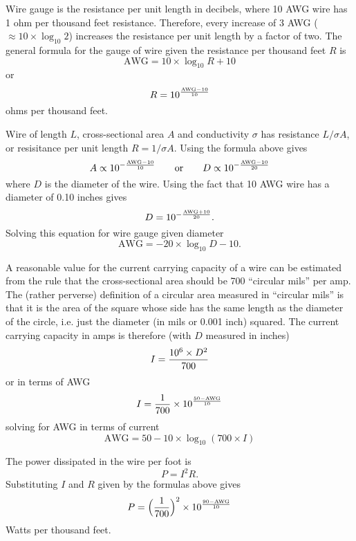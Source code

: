 \documentclass{minimal}
\begin{document}
Wire gauge is the resistance per unit length in decibels, where 10 AWG
wire has 1 ohm per thousand feet resistance.  Therefore, every
increase of 3 AWG ($\approx 10\times\log_{10}2$) increases the resistance
per unit length by a factor of two.  The general formula for the gauge
of wire given the resistance per thousand feet $R$ is
\begin{displaymath}
\mathrm{AWG} = 10 \times\log_{10}R + 10
\end{displaymath}
or
\begin{displaymath}
R = 10^{\mathrm{AWG}-10 \over 10}
\end{displaymath}
ohms per thousand feet.

Wire of length $L$, cross-sectional area $A$ and conductivity $\sigma$
has resistance $L/\sigma A$, or resisitance per unit length $R =
1/\sigma A$.  Using the formula above gives
\begin{displaymath}
A \propto 10^{-{\mathrm{AWG}-10 \over 10}}\qquad\mathrm{or}\qquad 
  D \propto 10^{-{\mathrm{AWG}-10 \over 20}}
\end{displaymath}
where $D$ is the diameter of the wire.  Using the fact that 10 AWG
wire has a diameter of 0.10 inches gives
\begin{displaymath}
D = 10^{-{\mathrm{AWG}+10 \over 20}}.
\end{displaymath}
Solving this equation for wire gauge given diameter
\begin{displaymath}
\mathrm{AWG}=-20\times\log_{10} D - 10.
\end{displaymath}

A reasonable value for the current carrying capacity of a wire can be
estimated from the rule that the cross-sectional area should be 700
``circular mils'' per amp.  The (rather perverse) definition of a
circular area measured in ``circular mils'' is that it is the area of
the square whose side has the same length as the diameter of the
circle, i.e. just the diameter (in mils or 0.001 inch) squared.  The
current carrying capacity in amps is therefore (with $D$ measured in
inches)
\begin{displaymath}
I={10^{6}\times D^2\over 700}
\end{displaymath}
or in terms of AWG
\begin{displaymath}
I={1\over 700}\times10^{50-\mathrm{AWG}\over 10}
\end{displaymath}
solving for AWG in terms of current
\begin{displaymath}
\mathrm{AWG}=50 - 10\times\log_{10}(700\times I)
\end{displaymath}

The power dissipated in the wire per foot is
\begin{displaymath}
P=I^2R.
\end{displaymath}
Substituting $I$ and $R$ given by the formulas above gives
\begin{displaymath}
P=\Big({1\over 700}\Big)^2\times10^{90-\mathrm{AWG}\over 10}
\end{displaymath}
Watts per thousand feet.
\end{document}
